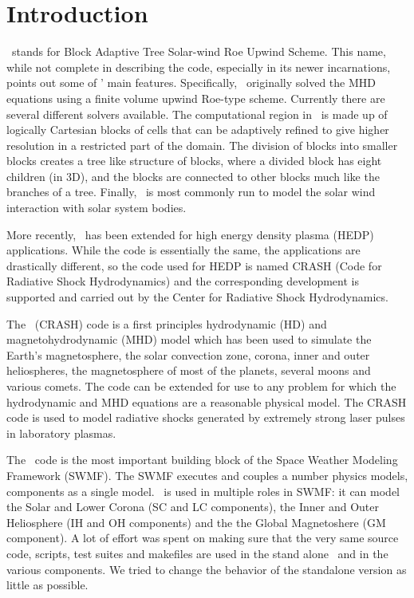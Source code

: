 \chapter{Introduction \label{chapter:introduction}}

\BATSRUS\ stands for Block Adaptive Tree Solar-wind Roe Upwind Scheme.
This name, while not complete in describing the code, especially in
its newer incarnations, points out some of \BATSRUS' main features.
Specifically, \BATSRUS\ originally solved the MHD equations using a
finite volume upwind Roe-type scheme.  Currently there are several
different solvers available.  The computational region in \BATSRUS\ is
made up of logically Cartesian blocks of cells that can be adaptively
refined to give higher resolution in a restricted part of the domain.
The division of blocks into smaller blocks creates a tree like
structure of blocks, where a divided block has eight children (in 3D), 
and the blocks are connected to other blocks much like the branches of a tree.
Finally, \BATSRUS\ is most commonly run to model the solar wind
interaction with solar system bodies.

More recently, \BATSRUS\ has been extended for high energy density plasma
(HEDP) applications. While the code is essentially the same, the applications
are drastically different, so the code used for HEDP is 
named CRASH (Code for Radiative Shock Hydrodynamics) 
and the corresponding development is supported and carried
out by the Center for Radiative Shock Hydrodynamics.

The \BATSRUS\ (CRASH) code is a first principles hydrodynamic (HD) and 
magnetohydrodynamic (MHD) model which has been used to simulate the Earth's 
magnetosphere, the solar convection zone, corona, inner and outer heliospheres, 
the magnetosphere of most of the planets, several moons and various comets.
The code can be extended for use to any problem for which the hydrodynamic
and MHD equations are a reasonable physical model. The CRASH code is used
to model radiative shocks generated by extremely strong laser pulses 
in laboratory plasmas.

The \BATSRUS\ code is the most important building block of the Space
Weather Modeling Framework (SWMF). The SWMF executes and couples a
number physics models, components as a single model.  \BATSRUS\ is
used in multiple roles in SWMF: it can model the Solar and Lower Corona 
(SC and LC components), the Inner and Outer Heliosphere (IH and OH components) 
and the the Global Magnetoshere (GM component).  
A lot of effort was spent on making sure
that the very same source code, scripts, test suites and makefiles are
used in the stand alone \BATSRUS\ and in the various components.  We
tried to change the behavior of the standalone version as little as
possible.

